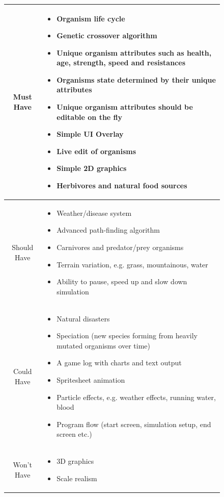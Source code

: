 \documentclass[a4paper, oneside, 11pt]{report}
\begin{document}
\begin{figure}[H]
	\centering
	\begin{tabular}{c|p{}}\label{moscow}
		Must Have & \begin{itemize}
			\itemsep0em
			\item Organism life cycle
			\item Genetic crossover algorithm
			\item Unique organism attributes such as health, age, strength, speed and resistances
			\item Organisms state determined by their unique attributes
			\item Unique organism attributes should be editable on the fly
			\item Simple UI Overlay
			\item Live edit of organisms
			\item Simple 2D graphics
			\item Herbivores and natural food sources
		\end{itemize} \\ \hline
		Should Have & \begin{itemize}
			\itemsep0em
			\item Weather/disease system
			\item Advanced path-finding algorithm
			\item Carnivores and predator/prey organisms
			\item Terrain variation, e.g. grass, mountainous, water
			\item Ability to pause, speed up and slow down simulation
		\end{itemize} \\ \hline
		Could Have & \begin{itemize}
			\itemsep0em
			\item Natural disasters
			\item Speciation (new species forming from heavily mutated organisms over time)
			\item A game log with charts and text output
			\item Spritesheet animation
			\item Particle effects, e.g. weather effects, running water, blood
			\item Program flow (start screen, simulation setup, end screen etc.)
		\end{itemize} \\ \hline
		Won't Have & \begin{itemize}
			\itemsep0em
			\item 3D graphics
			\item Scale realism
		\end{itemize} \\
	\end{tabular}
\end{figure}
\end{document}
